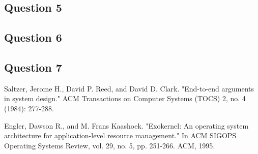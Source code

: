 \documentclass[12pt,a4paper,fleqn]{article}
\begin{document}
\subsection*{Question 5}
\label{sec:pq5}

\subsection*{Question 6}
\label{sec:pq6}

\subsection*{Question 7}
\label{sec:pq7}
 

\begin{thebibliography}{1}

 Saltzer, Jerome H., David P. Reed, and David D. Clark. "End-to-end arguments in system design." ACM Transactions on Computer Systems (TOCS) 2, no. 4 (1984): 277-288.

 Engler, Dawson R., and M. Frans Kaashoek. "Exokernel: An operating system architecture for application-level resource management." In ACM SIGOPS Operating Systems Review, vol. 29, no. 5, pp. 251-266. ACM, 1995.

\end{thebibliography}
\end{document}

